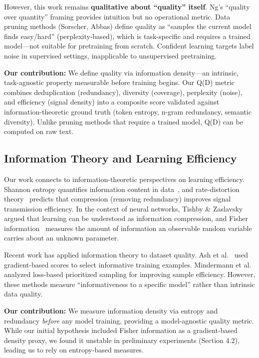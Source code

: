 However, this work remains \textbf{qualitative about ``quality'' itself}. Ng's ``quality over quantity'' framing provides intuition but no operational metric. Data pruning methods (Sorscher, Abbas) define quality as ``samples the current model finds easy/hard'' (perplexity-based), which is task-specific and requires a trained model---not suitable for pretraining from scratch. Confident learning targets label noise in supervised settings, inapplicable to unsupervised pretraining.

\textbf{Our contribution:} We define quality via information density---an intrinsic, task-agnostic property measurable before training begins. Our Q(D) metric combines deduplication (redundancy), diversity (coverage), perplexity (noise), and efficiency (signal density) into a composite score validated against information-theoretic ground truth (token entropy, n-gram redundancy, semantic diversity). Unlike pruning methods that require a trained model, Q(D) can be computed on raw text.

\subsection{Information Theory and Learning Efficiency}

Our work connects to information-theoretic perspectives on learning efficiency. Shannon entropy quantifies information content in data~\cite{shannon1948mathematical}, and rate-distortion theory~\cite{cover2006elements} predicts that compression (removing redundancy) improves signal transmission efficiency. In the context of neural networks, Tishby \& Zaslavsky~\cite{tishby2015deep} argued that learning can be understood as information compression, and Fisher information~\cite{ly2017tutorial} measures the amount of information an observable random variable carries about an unknown parameter.

Recent work has applied information theory to dataset quality. Ash et al.~\cite{ash2020deep} used gradient-based scores to select informative training examples. Mindermann et al.~\cite{mindermann2022prioritized} analyzed loss-based prioritized sampling for improving sample efficiency. However, these methods measure ``informativeness to a specific model'' rather than intrinsic data quality.

\textbf{Our contribution:} We measure information density via entropy and redundancy \textit{before} any model training, providing a model-agnostic quality metric. While our initial hypothesis included Fisher information as a gradient-based density proxy, we found it unstable in preliminary experiments (Section 4.2), leading us to rely on entropy-based measures.

